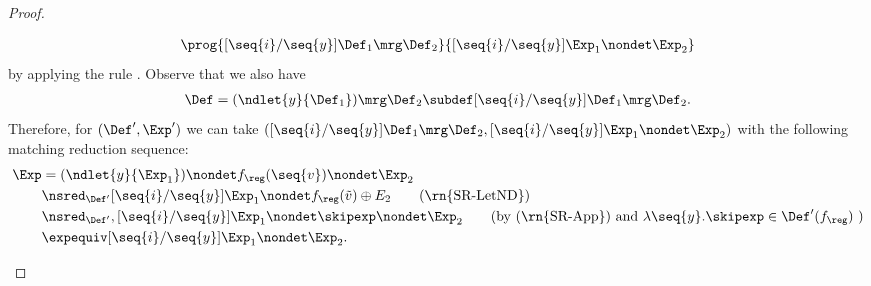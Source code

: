 \begin{proof}
\begin{description}
\begin{align*}
      \prog{[\seq{i}/\seq{y}]\Def_1 \mrg \Def_2}
           {[\seq{i}/\seq{y}]\Exp_1 \nondet \Exp_2}
    \end{align*}
    by applying the rule .
    Observe that we also have
    \begin{align*}
      \Def = (\ndlet{y}{\Def_1}) \mrg \Def_2 \subdef [\seq{i}/\seq{y}]\Def_1 \mrg \Def_2.
    \end{align*}
    Therefore, for \( (\Def', \Exp')\) we can take \( ([\seq{i}/\seq{y}]\Def_1 \mrg \Def_2, [\seq{i}/\seq{y}]\Exp_1 \nondet \Exp_2 )\) with the following matching reduction sequence:
    \begin{align*}
      \Exp
      &=  (\ndlet{y}{\Exp_1}) \nondet f_\reg(\seq{v}) \nondet \Exp_2 \\
      &\nsred_{\Def'} [\seq{i}/\seq{y}]\Exp_1 \nondet f_\reg(\tilde{v}) \oplus E_2 \tag{\rn{SR-LetND}} \\
        &\nsred_{\Def'}, [\seq{i}/\seq{y}]\Exp_1 \nondet \skipexp \nondet \Exp_2 \tag{by (\rn{SR-App}) and \( \lambda \seq{y}.\skipexp \in \Def'(f_\reg) \) } \\
        &\expequiv [\seq{i}/\seq{y}]\Exp_1 \nondet \Exp_2.
    \end{align*}


\end{description}
\end{proof}
